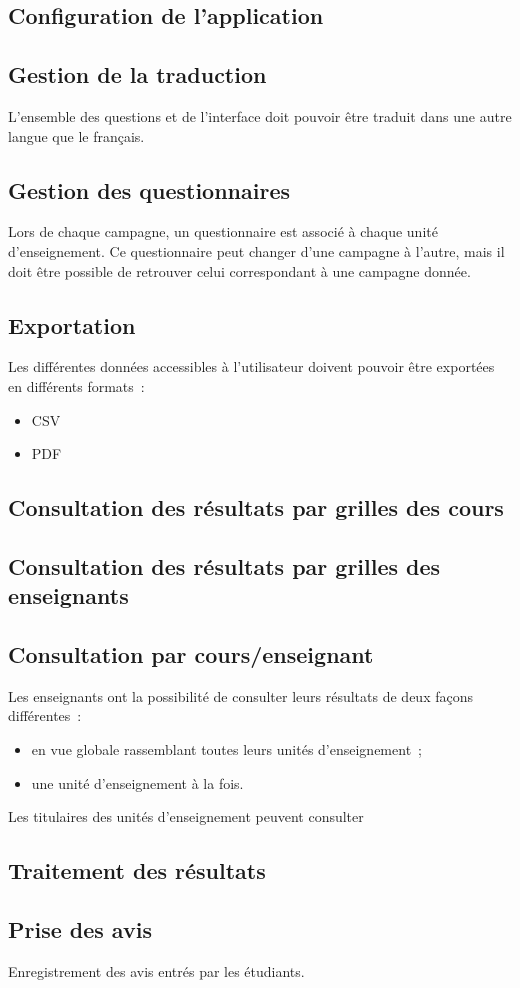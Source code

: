 \documentclass[a4paper,11pt]{report}
\begin{document}
\subsection{Configuration de l'application}

\subsection{Gestion de la traduction}
L'ensemble des questions et de l'interface doit pouvoir être traduit dans une autre langue que le français.

\subsection{Gestion des questionnaires}
Lors de chaque campagne, un questionnaire est associé à chaque unité d'enseignement.
Ce questionnaire peut changer d'une campagne à l'autre, mais il doit être possible de retrouver celui correspondant à une campagne donnée.

\subsection{Exportation}
Les différentes données accessibles à l'utilisateur doivent pouvoir être exportées en différents formats~:
\begin{itemize}
	\item CSV
	\item PDF
\end{itemize}



\subsection{Consultation des résultats par grilles des cours}

\subsection{Consultation des résultats par grilles des enseignants}

\subsection{Consultation par cours/enseignant}
Les enseignants ont la possibilité de consulter leurs résultats de deux façons différentes~:
\begin{itemize}
	\item en vue globale rassemblant toutes leurs unités d'enseignement~;
	\item une unité d'enseignement à la fois.
\end{itemize}

Les titulaires des unités d'enseignement peuvent consulter

\subsection{Traitement des résultats}

\subsection{Prise des avis}
Enregistrement des avis entrés par les étudiants.
\end{document}
